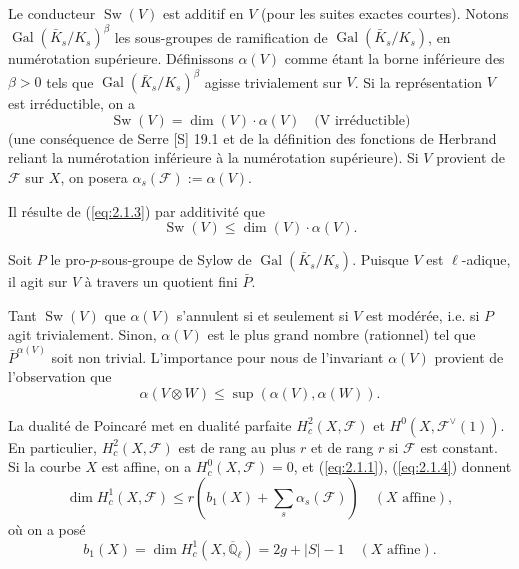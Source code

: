 \documentclass[11pt,a4paper]{article}
\theoremstyle{plain}
\theoremstyle{definition}
\DeclareMathOperator{\Gal}{Gal}
\DeclareMathOperator{\Sw}{Sw}
\begin{document}
Le conducteur $\Sw(V)$ est additif en $V$ (pour les suites exactes courtes). Notons $\Gal(\bar{K}_s/K_s)^\beta$ les sous-groupes de ramification de $\Gal(\bar{K}_s/K_s)$, en num\'erotation sup\'erieure. D\'efinissons $\alpha(V)$ comme \'etant la borne inf\'erieure des $\beta > 0$ tels que $\Gal(\bar{K}_s/K_s)^\beta$ agisse trivialement sur $V$. Si la repr\'esentation $V$ est irr\'eductible, on a
\begin{equation}\label{eq:2.1.3}
\Sw(V) = \dim(V) \cdot \alpha(V) \quad \text{(V irr\'eductible)}
\end{equation}
(une cons\'equence de Serre [S] 19.1 et de la d\'efinition des fonctions de Herbrand reliant la num\'erotation inf\'erieure \`a la num\'erotation sup\'erieure). Si $V$ provient de $\mathcal{F}$ sur $X$, on posera $\alpha_s(\mathcal{F}) := \alpha(V)$.

Il r\'esulte de (\ref{eq:2.1.3}) par additivit\'e que
\begin{equation}\label{eq:2.1.4}
\Sw(V) \leq \dim(V) \cdot \alpha(V).
\end{equation}

Soit $P$ le pro-$p$-sous-groupe de Sylow de $\Gal(\bar{K}_s/K_s)$. Puisque $V$ est $\ell$-adique, il agit sur $V$ \`a travers un quotient fini $\bar{P}$.

Tant $\Sw(V)$ que $\alpha(V)$ s'annulent si et seulement si $V$ est mod\'er\'ee, i.e. si $P$ agit trivialement. Sinon, $\alpha(V)$ est le plus grand nombre (rationnel) tel que $\bar{P}^{\alpha(V)}$ soit non trivial. L'importance pour nous de l'invariant $\alpha(V)$ provient de l'observation que
\begin{equation}\label{eq:2.1.5}
\alpha(V \otimes W) \leq \sup(\alpha(V), \alpha(W)).
\end{equation}

La dualit\'e de Poincar\'e met en dualit\'e parfaite $H_c^2(X, \mathcal{F})$ et $H^0(X, \mathcal{F}^\vee(1))$. En particulier, $H_c^2(X, \mathcal{F})$ est de rang au plus $r$ et de rang $r$ si $\mathcal{F}$ est constant. Si la courbe $X$ est affine, on a $H_c^0(X, \mathcal{F}) = 0$, et (\ref{eq:2.1.1}), (\ref{eq:2.1.4}) donnent
\begin{equation}\label{eq:2.1.6}
\dim H_c^1(X, \mathcal{F}) \leq r(b_1(X) + \sum_s \alpha_s(\mathcal{F})) \quad (X \text{ affine}),
\end{equation}
o\`u on a pos\'e
\begin{equation}\label{eq:2.1.7}
b_1(X) = \dim H_c^1(X, \overline{\mathbb{Q}}_\ell) = 2g + |S| - 1 \quad (X \text{ affine}).
\end{equation}
\end{document}
